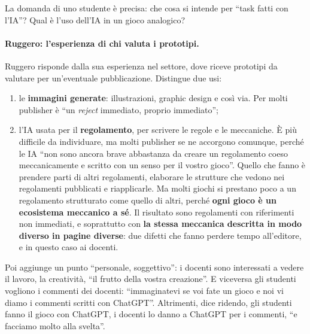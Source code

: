 La domanda di uno studente è precisa: che cosa si intende per ``task fatti con
l'IA''? Qual è l'uso dell'IA in un gioco analogico?

\paragraph{Ruggero: l'esperienza di chi valuta i prototipi.} Ruggero risponde
dalla sua esperienza nel settore, dove riceve prototipi da valutare per
un'eventuale pubblicazione. Distingue due usi:
\begin{enumerate}
  \item le \textbf{immagini generate}: illustrazioni, graphic design e così via.
        Per molti publisher è ``un \emph{reject} immediato, proprio immediato'';
  \item l'IA usata per il \textbf{regolamento}, per scrivere le regole e le
        meccaniche. È più difficile da individuare, ma molti publisher se ne
        accorgono comunque, perché le IA ``non sono ancora brave abbastanza da
        creare un regolamento coeso meccanicamente e scritto con un senso per il
        vostro gioco''. Quello che fanno è prendere parti di altri regolamenti,
        elaborare le strutture che vedono nei regolamenti pubblicati e
        riapplicarle. Ma molti giochi si prestano poco a un regolamento
        strutturato come quello di altri, perché \textbf{ogni gioco è un
        ecosistema meccanico a sé}. Il risultato sono regolamenti con
        riferimenti non immediati, e soprattutto con \textbf{la stessa meccanica
        descritta in modo diverso in pagine diverse}: due difetti che fanno
        perdere tempo all'editore, e in questo caso ai docenti.
\end{enumerate}
Poi aggiunge un punto ``personale, soggettivo'': i docenti sono interessati a
vedere il lavoro, la creatività, ``il frutto della vostra creazione''. E
viceversa gli studenti vogliono i commenti dei docenti: ``immaginatevi se voi
fate un gioco e noi vi diamo i commenti scritti con ChatGPT''. Altrimenti, dice
ridendo, gli studenti fanno il gioco con ChatGPT, i docenti lo danno a ChatGPT
per i commenti, ``e facciamo molto alla svelta''.

